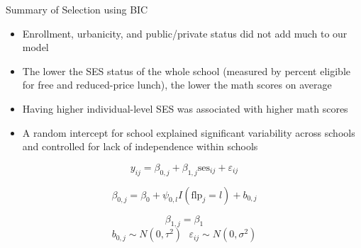 \documentclass[ignorenonframetext,]{beamer}
\providecommand{\tightlist}{%
  \setlength{\itemsep}{0pt}\setlength{\parskip}{0pt}}
\begin{document}
\begin{frame}{Summary of Selection using BIC}

\begin{itemize}
\tightlist
\item
  Enrollment, urbanicity, and public/private status did not add much to
  our model
\item
  The lower the SES status of the whole school (measured by percent
  eligible for free and reduced-price lunch), the lower the math scores
  on average
\item
  Having higher individual-level SES was associated with higher math
  scores
\item
  A random intercept for school explained significant variability across
  schools and controlled for lack of independence within schools
\end{itemize}

\[y_{ij}=\beta_{0,j}+\beta_{1,j}\text{ses}_{ij}+ \varepsilon_{ij}\]

\[\beta_{0,j}=\beta_0+\psi_{0,l}I(\text{flp}_j=l)+b_{0,j}\]

\[\beta_{1,j}=\beta_1\]
\[b_{0,j} \sim N \left( 0 ,\tau^2 \right) ~~~ \varepsilon_{ij}\sim N(0,\sigma^2)\]

\end{frame}
\end{document}
